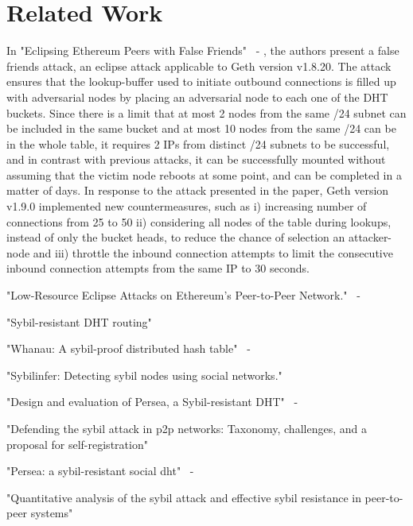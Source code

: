 
\section{Related Work}

In "Eclipsing Ethereum Peers with False Friends"~\cite{henningsen2019eclipsing} - ,  the authors present 
a false friends attack,  an eclipse attack applicable to Geth version v1.8.20.  The attack ensures that the lookup-buffer used to initiate outbound connections is filled up with adversarial nodes by placing an adversarial node to each one of the DHT buckets. 
Since there is a limit that at most 2 nodes from the same /24 subnet can be included in the same bucket and at most 10 nodes from the same /24 can be in the whole table,  it requires  2 IPs from distinct /24 subnets to be successful,  and in contrast
with previous attacks, it can be successfully mounted without
assuming that the victim node reboots at some point, and can be completed in a matter of days.
In response to the attack presented in the paper,  Geth version v1.9.0 implemented new countermeasures,  such as i) increasing number of connections from 25 to 50 ii) considering all nodes of the table during lookups, instead of only the bucket heads,  to reduce the chance
of selection an attacker-node and iii) throttle the inbound connection attempts to limit the consecutive inbound connection attempts from the same IP to 30 seconds.

"Low-Resource Eclipse Attacks on Ethereum's Peer-to-Peer Network."~\cite{marcus2018low} - 

"Sybil-resistant DHT routing"~\cite{danezis2005sybil}

"Whanau: A sybil-proof distributed hash table"~\cite{lesniewski2010whanau} - 

"Sybilinfer: Detecting sybil nodes using social networks."~\cite{danezis2009sybilinfer}

"Design and evaluation of Persea, a Sybil-resistant DHT"~\cite{al2014design} - 

"Defending the sybil attack in p2p networks: Taxonomy, challenges, and a proposal for self-registration"~\cite{dinger2006defending}

"Persea: a sybil-resistant social dht"~\cite{al2013persea} - 

"Quantitative analysis of the sybil attack and effective sybil resistance in peer-to-peer systems"~\cite{jetter2010quantitative}

